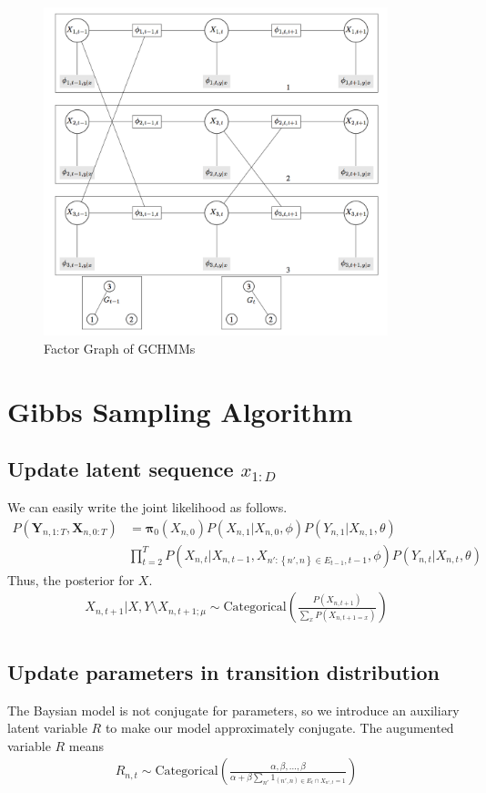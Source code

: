 \documentclass{article} %
\begin{document}
\begin{figure}[t]
\centering
\includegraphics[width=100mm]{EM_GCHMM.png}
\caption{Factor Graph of GCHMMs}
\label{fig:fgchmm}
\end{figure}

\section{Gibbs Sampling Algorithm}

\subsection{Update latent sequence $x_{1:D}$}
We can easily write the joint likelihood as follows.
\begin{align*}
P(\mathbf{Y}_{n,1:T}, \mathbf{X}_{n,0:T}) 
&= \boldsymbol{\pi}_0(X_{n,0})P(X_{n,1}|X_{n,0},\phi)P(Y_{n,1}|X_{n, 1}, \theta)\\
&\prod_{t = 2}^{T} P(X_{n,t}|X_{n, t-1}, X_{n': \left \{ n',n \right \}\in E_{t-1},t-1}, \phi)P(Y_{n,t}|X_{n, t}, \theta)
\end{align*}
Thus, the posterior for $X$.
\begin{align*}
X_{n,t+1}|{X,Y} \setminus X_{n,t+1;\mu} \sim \text{Categorical}\left( \frac{P(X_{n,t+1})}{\sum_{x}P(X_{n,t+1=x})}\right) \\
\end{align*}

\subsection{Update parameters in transition distribution}
The Baysian model is not conjugate for parameters, so we introduce an auxiliary latent variable $R$ to make our model approximately conjugate. 
The augumented variable $R$ means 
\begin{align*}
R_{n,t} \sim \text{Categorical}\left( \frac{\alpha,\beta, ..., \beta }{\alpha +\beta\sum_{n'}1_{(n',n)\in E_{t}\cap X_{n',t} =1} } \right)
\end{align*}
\end{document}
